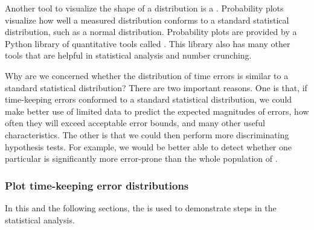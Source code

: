Another tool to visualize the shape of a distribution is a .
Probability plots visualize how well a measured distribution conforms to a standard statistical distribution, such as a normal distribution. 
Probability plots are provided by a Python library of quantitative tools called \scipy.
This library also has many other tools that are helpful in statistical analysis and number crunching. 

Why are we concerned whether the distribution of time errors is similar to a standard statistical distribution? 
There are two important reasons. 
One is that, if time-keeping errors conformed to a standard statistical distribution, we could make better use of limited data to predict the expected magnitudes of errors, how often they will exceed acceptable error bounds, and many other useful characteristics. 
The other is that we could then perform more discriminating hypothesis tests.
For example, we would be better able to detect whether one particular \rtc is significantly more error-prone than the whole population of \rtcs.


\subsubsection{\howto Plot time-keeping error distributions}
In this and the following sections, the  is used to demonstrate steps in the statistical analysis. 

